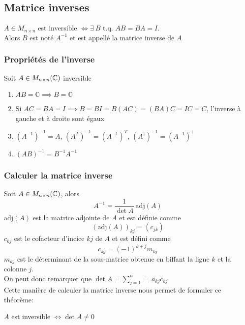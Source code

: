 \subsection{Matrice inverses}
\begin{definition}
    $A \in M_{n \times n}$ est inversible $\iff \exists \ B$ t.q. $AB = BA = I$. \\
    Alors $B$ est noté $A^{-1}$ et est appellé la matrice inverse de $A$
\end{definition}
\subsubsection{Propriétés de l'inverse}
\noindent
Soit $A \in M_{n \times n}(\mathbb{C})$ inversible \begin{enumerate}
    \item $AB = \mathbb{O} \implies B = \mathbb{O}$
    \item Si $AC = BA = I \implies B = BI = B(AC) = (BA)C = IC = C $, l'inverse à gauche et à droite sont égaux
    \item $(A^{-1})^{-1} = A$, \quad $(A^T)^{-1} = (A^{-1})^{T}$, \quad $(A^\dagger)^{-1} = (A^{-1})^{\dagger}$
    \item $(AB)^{-1} = B^{-1}A^{-1}$
\end{enumerate}

\subsubsection{Calculer la matrice inverse}
\noindent
Soit $A \in M_{n \times n}(\mathbb{C})$, alors
\[ A^{-1} = \frac{1}{\det A} \ \text{adj}(A) \]
$\text{adj}(A)$ est la matrice adjointe de $A$ et est définie comme
\[ \left(\text{adj}(A)\right)_{kj} = \left( c_{jk} \right) \]
$c_{kj}$ est le cofacteur d'incice $kj$ de $A$ et est défini comme
\[ c_{kj} = (-1)^{k + j}m_{kj} \]
$m_{kj}$ est le déterminant de la sous-matrice obtenue en biffant la ligne $k$ et la colonne $j$. \\
On peut donc remarquer que $\det A = \sum_{j = 1}^{n} = a_{kj} c_{kj}$ \\
Cette manière de calculer la matrice inverse nous permet de formuler ce théorème:
\begin{theorem}
    \label{inversible_small}
    $A$ est inversible $\iff \det A \neq 0$
\end{theorem}

